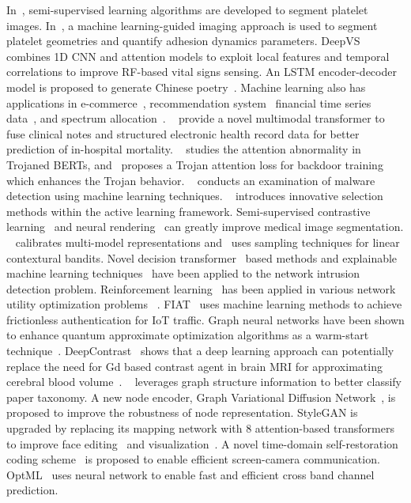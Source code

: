 In~\cite{peineng2021,peineng2021semi}, semi-supervised learning algorithms are developed to segment platelet images.
In~\cite{peineng2023}, a machine learning-guided imaging approach is used to segment platelet geometries and quantify adhesion dynamics parameters.
DeepVS~\cite{zongxing2022dl} combines 1D CNN and attention models to exploit local features and temporal correlations to improve RF-based vital signs sensing.
An LSTM encoder-decoder model is proposed to generate Chinese poetry~\cite{yubo2017text}.
Machine learning also has applications in e-commerce~\cite{kexin2023ecommerce}, recommendation system~\cite{dong2020,dong2023,dong2023recommend}
financial time series data~\cite{kexin2023financial}, and spectrum allocation~\cite{mohammad2024}.
~\cite{lyu-clinical} provide a novel multimodal transformer to fuse clinical notes and structured electronic health record data
 for better prediction of in-hospital mortality.
~\cite{lyu-2022-trojaned} studies the attention abnormality in Trojaned BERTs,
and~\cite{lyu-2023-attentionenhancing} proposes a Trojan attention loss for backdoor training which enhances
the Trojan behavior.
~\cite{zhenglin} conducts an examination of malware detection using machine learning techniques.
~\cite{hongpeng2024} introduces innovative selection methods within the active learning framework.
Semi-supervised contrastive learning~\cite{yifei2023medical} and neural rendering~\cite{yifei2023medical2} can greatly improve medical image segmentation.
~\cite{yifei2024} calibrates multi-model representations and~\cite{yifei2023samping} uses sampling techniques for linear contextural bandits.
Novel decision transformer~\cite{chen2023real} based methods and explainable machine learning techniques~\cite{chen2023ride,chen2023explainable} have been applied to the network intrusion detection problem.
Reinforcement learning~\cite{chen2023rgmcomm} has been applied in various network utility optimization problems~\cite{chen2021bringing,chen2023distributional} .
FIAT~\cite{yunming2022} uses machine learning methods to achieve frictionless authentication for IoT traffic.
Graph neural networks have been shown to enhance quantum approximate optimization algorithms as a warm-start technique~\cite{zhiding2024}.
DeepContrast~\cite{chenliu2020} shows that a deep learning approach can potentially replace the need for Gd based contrast agent in brain MRI 
for approximating cerebral blood volume~\cite{chenliu2022}.
~\cite{zhuang2024understanding} leverages graph structure information to better classify paper taxonomy.
A new node encoder, Graph Variational Diffusion Network~\cite{zhuang2023robust}, is proposed to improve the robustness of node representation.
StyleGAN is upgraded by replacing its mapping network with 8 attention-based transformers to improve face editing~\cite{xinyu2023} and visualization~\cite{xinyu_visual}.
A novel time-domain self-restoration coding scheme~\cite{yifan2019} is proposed to enable efficient screen-camera communication. 
OptML~\cite{yifan2019mobi} uses neural network to enable fast and efficient cross band channel prediction.


